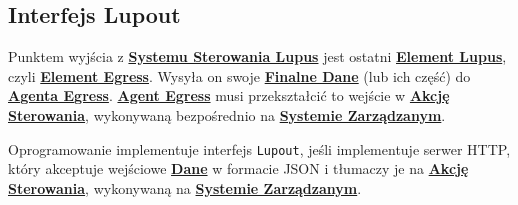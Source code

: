 \subsection{Interfejs Lupout}

Punktem wyjścia z \hyperlink{def:system-sterowania}{\textbf{Systemu Sterowania Lupus}} jest ostatni \hyperlink{def:element-lupus}{\textbf{Element Lupus}}, czyli \hyperlink{def:element-egress}{\textbf{Element Egress}}. Wysyła on swoje \hyperlink{def:finalne-dane}{\textbf{Finalne Dane}} (lub ich część) do \hyperlink{def:agent-egress}{\textbf{Agenta Egress}}. \hyperlink{def:agent-egress}{\textbf{Agent Egress}} musi przekształcić to wejście w \hyperlink{def:akcja-sterujaca}{\textbf{Akcję Sterowania}}, wykonywaną bezpośrednio na \hyperlink{def:system-zarzadzany}{\textbf{Systemie Zarządzanym}}.

Oprogramowanie implementuje interfejs \texttt{Lupout}, jeśli implementuje serwer HTTP, który akceptuje wejściowe \hyperlink{def:dane}{\textbf{Dane}} w formacie JSON i tłumaczy je na \hyperlink{def:akcja-sterujaca}{\textbf{Akcję Sterowania}}, wykonywaną na \hyperlink{def:system-zarzadzany}{\textbf{Systemie Zarządzanym}}. 
